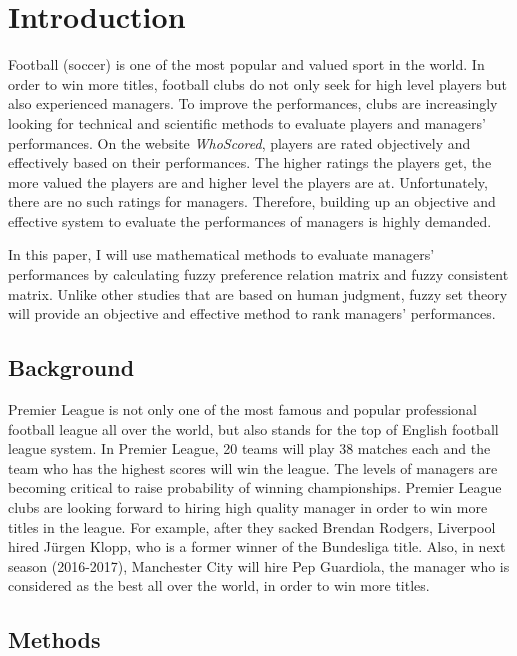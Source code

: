 \documentclass[12pt,a4paper]{article}
\begin{document}
\tableofcontents
\newpage

\section{Introduction}

    Football (soccer) is one of the most popular and valued sport in the world. In order to win more titles, football clubs do not only seek for high level players but also experienced managers. To improve the performances, clubs are increasingly looking for technical and scientific methods to evaluate players and managers' performances. On the website \emph{WhoScored}, players are rated objectively and effectively based on their performances. The higher ratings the players get, the more valued the players are and higher level the players are at. Unfortunately, there are no such ratings for managers. Therefore, building up an objective and effective system to evaluate the performances of managers is highly demanded. 
    
    In this paper, I will use mathematical methods to evaluate managers' performances by calculating fuzzy preference relation matrix and fuzzy consistent matrix. Unlike other studies that are based on human judgment, fuzzy set theory will provide an objective and effective method to rank managers' performances.
    
    
    
    
\subsection{Background}

    Premier League is not only one of the most famous and popular professional football league all over the world, but also stands for the top of English football league system. In Premier League, 20 teams will play 38 matches each and the team who has the highest scores will win the league. The levels of managers are becoming critical to raise probability of winning championships. Premier League clubs are looking forward to hiring high quality manager in order to win more titles in the league. For example, after they sacked Brendan Rodgers, Liverpool hired Jürgen Klopp, who is a former winner of the Bundesliga title. Also, in next season (2016-2017), Manchester City will hire Pep Guardiola, the manager who is considered as the best all over the world, in order to win more titles.
	
\subsection{Methods}
\end{document}

